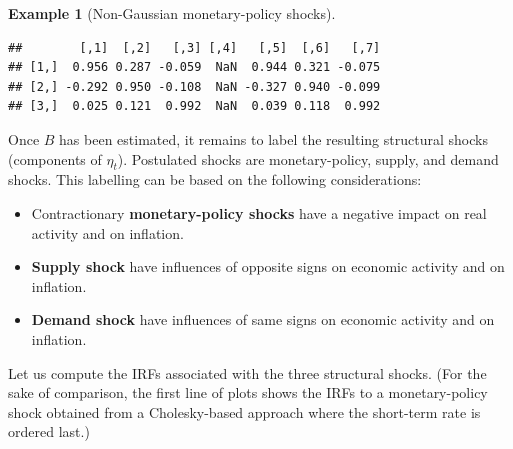 \documentclass[
  12pt,
]{book}
\providecommand{\tightlist}{%
  \setlength{\itemsep}{0pt}\setlength{\parskip}{0pt}}
\theoremstyle{definition}
\theoremstyle{definition}
\newtheorem{example}{Example}[chapter]
\theoremstyle{definition}
\theoremstyle{definition}
\theoremstyle{remark}
\begin{document}
\begin{example}[Non-Gaussian monetary-policy shocks]
\begin{verbatim}
##        [,1]  [,2]   [,3] [,4]   [,5]  [,6]   [,7]
## [1,]  0.956 0.287 -0.059  NaN  0.944 0.321 -0.075
## [2,] -0.292 0.950 -0.108  NaN -0.327 0.940 -0.099
## [3,]  0.025 0.121  0.992  NaN  0.039 0.118  0.992
\end{verbatim}

Once \(B\) has been estimated, it remains to label the resulting structural shocks (components of \(\eta_{t}\)). Postulated shocks are monetary-policy, supply, and demand shocks. This labelling can be based on the following considerations:

\begin{itemize}
\tightlist
\item
  Contractionary \textbf{monetary-policy shocks} have a negative impact on real activity and on inflation.
\item
  \textbf{Supply shock} have influences of opposite signs on economic activity and on inflation.
\item
  \textbf{Demand shock} have influences of same signs on economic activity and on inflation.
\end{itemize}

Let us compute the IRFs associated with the three structural shocks. (For the sake of comparison, the first line of plots shows the IRFs to a monetary-policy shock obtained from a Cholesky-based approach where the short-term rate is ordered last.)


\end{example}
\end{document}
